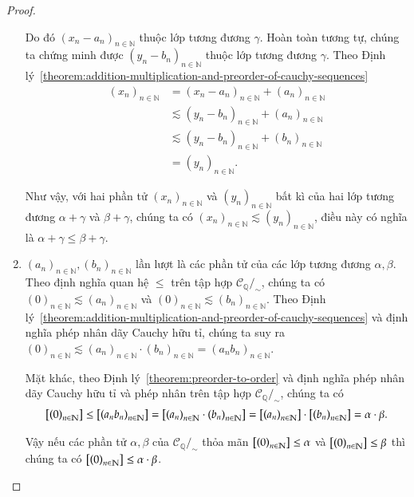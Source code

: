 \begin{proof}
\begin{enumerate}[label={(\roman*)}]
              Do đó ${(x_{n} - a_{n})}_{n\in\mathbb{N}}$ thuộc lớp tương đương $\gamma$. Hoàn toàn tương tự, chúng ta chứng minh được ${(y_{n} - b_{n})}_{n\in\mathbb{N}}$ thuộc lớp tương đương $\gamma$. Theo Định lý~\ref{theorem:addition-multiplication-and-preorder-of-cauchy-sequences}
              \begin{align*}
                  {(x_{n})}_{n\in\mathbb{N}} & = {(x_{n} - a_{n})}_{n\in\mathbb{N}} + {(a_{n})}_{n\in\mathbb{N}}         \\
                                             & \lesssim  {(y_{n} - b_{n})}_{n\in\mathbb{N}} + {(a_{n})}_{n\in\mathbb{N}} \\
                                             & \lesssim {(y_{n} - b_{n})}_{n\in\mathbb{N}} + {(b_{n})}_{n\in\mathbb{N}}  \\
                                             & = {(y_{n})}_{n\in\mathbb{N}}.
              \end{align*}

              Như vậy, với hai phần tử ${(x_{n})}_{n\in\mathbb{N}}$ và ${(y_{n})}_{n\in\mathbb{N}}$ bất kì của hai lớp tương đương $\alpha + \gamma$ và $\beta + \gamma$, chúng ta có ${(x_{n})}_{n\in\mathbb{N}}\lesssim {(y_{n})}_{n\in\mathbb{N}}$, điều này có nghĩa là $\alpha + \gamma \leq \beta + \gamma$.
        \item  ${(a_{n})}_{n\in\mathbb{N}}, {(b_{n})}_{n\in\mathbb{N}}$ lần lượt là các phần tử của các lớp tương đương $\alpha, \beta$. Theo định nghĩa quan hệ $\leq$ trên tập hợp $\mathscr{C}_{\mathbb{Q}}/_{\sim}$, chúng ta có ${(0)}_{n\in\mathbb{N}}\lesssim {(a_{n})}_{n\in\mathbb{N}}$ và ${(0)}_{n\in\mathbb{N}}\lesssim {(b_{n})}_{n\in\mathbb{N}}$. Theo Định lý~\ref{theorem:addition-multiplication-and-preorder-of-cauchy-sequences} và định nghĩa phép nhân dãy Cauchy hữu tỉ, chúng ta suy ra ${(0)}_{n\in\mathbb{N}} \lesssim {(a_{n})}_{n\in\mathbb{N}}\cdot{(b_{n})}_{n\in\mathbb{N}} = {(a_{n}b_{n})}_{n\in\mathbb{N}}$.

              Mặt khác, theo Định lý~\ref{theorem:preorder-to-order} và định nghĩa phép nhân dãy Cauchy hữu tỉ và phép nhân trên tập hợp $\mathscr{C}_{\mathbb{Q}}/_{\sim}$, chúng ta có
              \begin{align*}
                  \left[{\left({0}\right)}_{{n}\in\mathbb{N}}\right] \leq \left[{\left({a_{n}b_{n}}\right)}_{{n}\in\mathbb{N}}\right] = \left[{(a_{n})}_{n\in\mathbb{N}}\cdot{(b_{n})}_{n\in\mathbb{N}}\right] = \left[{\left({a_{n}}\right)}_{{n}\in\mathbb{N}}\right]\cdot\left[{\left({b_{n}}\right)}_{{n}\in\mathbb{N}}\right] = \alpha\cdot\beta.
              \end{align*}

              Vậy nếu các phần tử $\alpha, \beta$ của $\mathscr{C}_{\mathbb{Q}}/_{\sim}$ thỏa mãn $\left[{\left({0}\right)}_{{n}\in\mathbb{N}}\right] \leq \alpha$ và $\left[{\left({0}\right)}_{{n}\in\mathbb{N}}\right]\leq \beta$ thì chúng ta có $\left[{\left({0}\right)}_{{n}\in\mathbb{N}}\right]\leq \alpha\cdot\beta$.
    \end{enumerate}
\end{proof}

